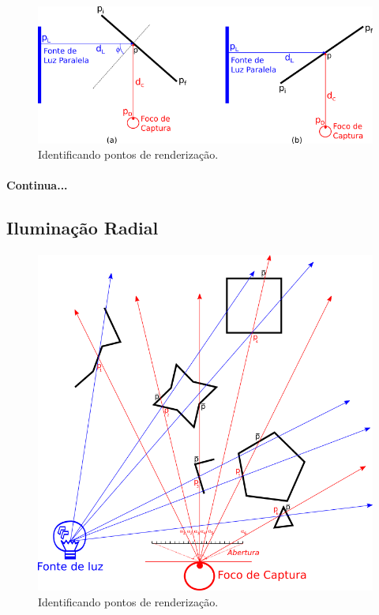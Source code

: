 \documentclass{article}
\begin{document}
	\paragraph{}
	\begin{figure}[h]
		\centering
		\includegraphics[scale=0.7]{radiosity}
		\caption{Identificando pontos de renderização.}
		\label{fig:radio}
	\end{figure}

	\paragraph{}
	\textbf{Continua...}

	\subsection{Iluminação Radial}
	
	\paragraph{}
	\begin{figure}[h]
		\centering
		\includegraphics[scale=0.8]{Renderizacao-2D-1D-radial}
		\caption{Identificando pontos de renderização.}
		\label{fig:rend-rad}
	\end{figure}
	
\end{document}
